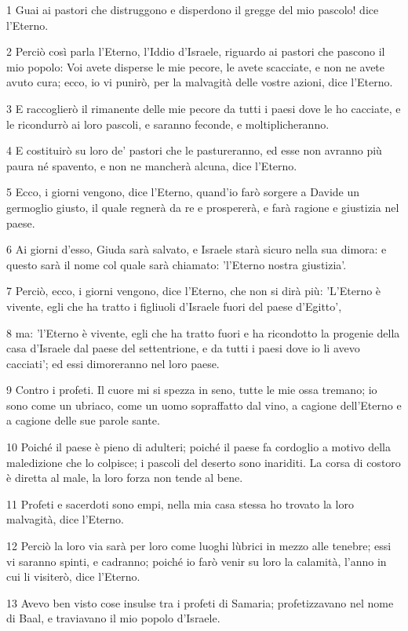 \par 1 Guai ai pastori che distruggono e disperdono il gregge del mio pascolo! dice l'Eterno.
\par 2 Perciò così parla l'Eterno, l'Iddio d'Israele, riguardo ai pastori che pascono il mio popolo: Voi avete disperse le mie pecore, le avete scacciate, e non ne avete avuto cura; ecco, io vi punirò, per la malvagità delle vostre azioni, dice l'Eterno.
\par 3 E raccoglierò il rimanente delle mie pecore da tutti i paesi dove le ho cacciate, e le ricondurrò ai loro pascoli, e saranno feconde, e moltiplicheranno.
\par 4 E costituirò su loro de' pastori che le pastureranno, ed esse non avranno più paura né spavento, e non ne mancherà alcuna, dice l'Eterno.
\par 5 Ecco, i giorni vengono, dice l'Eterno, quand'io farò sorgere a Davide un germoglio giusto, il quale regnerà da re e prospererà, e farà ragione e giustizia nel paese.
\par 6 Ai giorni d'esso, Giuda sarà salvato, e Israele starà sicuro nella sua dimora: e questo sarà il nome col quale sarà chiamato: 'l'Eterno nostra giustizia'.
\par 7 Perciò, ecco, i giorni vengono, dice l'Eterno, che non si dirà più: 'L'Eterno è vivente, egli che ha tratto i figliuoli d'Israele fuori del paese d'Egitto',
\par 8 ma: 'l'Eterno è vivente, egli che ha tratto fuori e ha ricondotto la progenie della casa d'Israele dal paese del settentrione, e da tutti i paesi dove io li avevo cacciati'; ed essi dimoreranno nel loro paese.
\par 9 Contro i profeti. Il cuore mi si spezza in seno, tutte le mie ossa tremano; io sono come un ubriaco, come un uomo sopraffatto dal vino, a cagione dell'Eterno e a cagione delle sue parole sante.
\par 10 Poiché il paese è pieno di adulteri; poiché il paese fa cordoglio a motivo della maledizione che lo colpisce; i pascoli del deserto sono inariditi. La corsa di costoro è diretta al male, la loro forza non tende al bene.
\par 11 Profeti e sacerdoti sono empi, nella mia casa stessa ho trovato la loro malvagità, dice l'Eterno.
\par 12 Perciò la loro via sarà per loro come luoghi lùbrici in mezzo alle tenebre; essi vi saranno spinti, e cadranno; poiché io farò venir su loro la calamità, l'anno in cui li visiterò, dice l'Eterno.
\par 13 Avevo ben visto cose insulse tra i profeti di Samaria; profetizzavano nel nome di Baal, e traviavano il mio popolo d'Israele.
